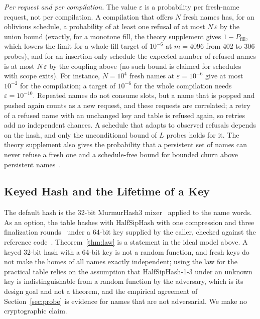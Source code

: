 \emph{Per request and per compilation.} The value $\varepsilon$ is a probability per fresh-name request, not per compilation. A compilation that offers $N$ fresh names has, for an oblivious schedule, a probability of at least one refusal of at most $N\,\varepsilon$ by the union bound (exactly, for a monotone fill, the theory supplement gives $1-P_{\mathrm{fill}}$, which lowers the limit for a whole-fill target of $10^{-6}$ at $m=4096$ from 402 to 306 probes), and for an insertion-only schedule the expected number of refused names is at most $N\,\varepsilon$ by the coupling above (no such bound is claimed for schedules with scope exits). For instance, $N=10^{4}$ fresh names at $\varepsilon=10^{-6}$ give at most $10^{-2}$ for the compilation; a target of $10^{-6}$ for the whole compilation needs $\varepsilon=10^{-10}$. Repeated names do not consume slots, but a name that is popped and pushed again counts as a new request, and these requests are correlated; a retry of a refused name with an unchanged key and table is refused again, so retries add no independent chances. A schedule that adapts to observed refusals depends on the hash, and only the unconditional bound of $L$ probes holds for it. The theory supplement also gives the probability that a persistent set of names can never refuse a fresh one and a schedule-free bound for bounded churn above persistent names~\cite{strata}.

\subsection{Keyed Hash and the Lifetime of a Key}
\label{sec:keyed}
The default hash is the 32-bit MurmurHash3 mixer~\cite{murmur3} applied to the name words. As an option, the table hashes with HalfSipHash with one compression and three finalization rounds~\cite{aumasson2012,linuxsiphash} under a 64-bit key supplied by the caller, checked against the reference code~\cite{siphashref}. Theorem~\ref{thm:law} is a statement in the ideal model above. A keyed 32-bit hash with a 64-bit key is not a random function, and fresh keys do not make the homes of all names exactly independent; using the law for the practical table relies on the assumption that HalfSipHash-1-3 under an unknown key is indistinguishable from a random function by the adversary, which is its design goal and not a theorem, and the empirical agreement of Section~\ref{sec:probe} is evidence for names that are not adversarial. We make no cryptographic claim.

